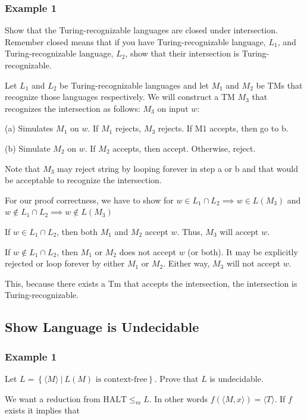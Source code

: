 \subsubsection{Example 1}
Show that the Turing-recognizable languages are closed under
intersection. Remember closed means that if you have Turing-recognizable
language, $L_1$, and Turing-recognizable language, $L_2$, show that
their intersection is Turing-recognizable.

Let $L_1$ and $L_2$ be Turing-recognizable languages and let $M_1$ and
$M_2$ be TMs that recognize those languages respectively. We will
construct a TM $M_3$ that recognizes the intersection as follows: $M_3$
on input $w$:

\hspace{1mm}(a) Simulates $M_1$ on $w$. If $M_1$ rejects, $M_3$ rejects.
If M1 accepts, then go to b.

\hspace{1mm}(b) Simulate $M_2$ on $w$. If $M_2$ accepts, then accept.
Otherwise, reject.

Note that $M_3$ may reject string by looping forever in step a or b and
that would be acceptable to recognize the intersection.

For our proof correctness, we have to show for $w \in L_1 \cap L_2
\implies w \in L(M_3)$ and $w \notin L_1 \cap L_2 \implies w \notin
L(M_3)$

If $w \in L_1 \cap L_2$, then both $M_1$ and $M_2$ accept $w$. Thus,
$M_3$ will accept $w$.

If $w \notin L_1 \cap L_2$, then $M_1$ or $M_2$ does not accept $w$ (or
both). It may be explicitly rejected or loop forever by either $M_1$ or
$M_2$. Either way, $M_3$ will not accept $w$.

This, because there exists a Tm that accepts the intersection, the
intersection is Turing-recognizable.

\subsection{Show Language is Undecidable}
\subsubsection{Example 1}
Let $L = \left\{\langle M \rangle ~|~ L(M) \textrm{ is
context-free}\right\}$. Prove that $L$ is undecidable.

We want a reduction from $\textrm{HALT} \leq_m L$. In other words
$f(\langle M, x \rangle) = \langle T \rangle$. If $f$ exists it implies
that

